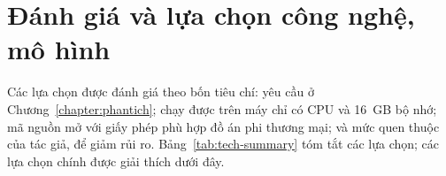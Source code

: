 \section{Đánh giá và lựa chọn công nghệ, mô hình}
\label{sec:6.1}

Các lựa chọn được đánh giá theo bốn tiêu chí: yêu cầu ở Chương~\ref{chapter:phantich}; chạy được trên máy chỉ có CPU và 16~GB bộ nhớ; mã nguồn mở với giấy phép phù hợp đồ án phi thương mại; và mức quen thuộc của tác giả, để giảm rủi ro. Bảng~\ref{tab:tech-summary} tóm tắt các lựa chọn; các lựa chọn chính được giải thích dưới đây.

